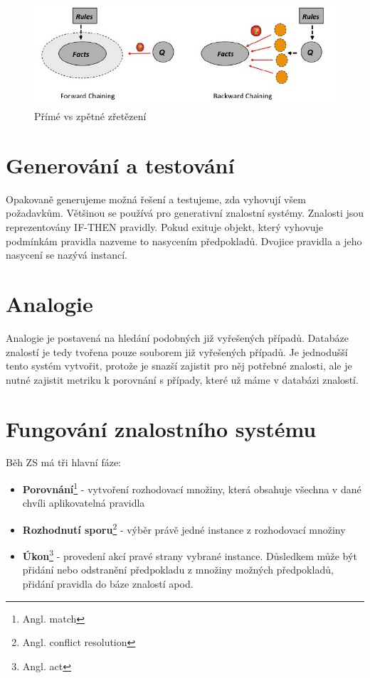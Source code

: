 \documentclass{article}
\begin{document}
\begin{figure}[h]
\begin{center}
\includegraphics[scale=0.5]{FBC.png}
\caption{Přímé vs zpětné zřetězení}
\end{center}
\end{figure}

\section*{Generování a testování}

Opakovaně generujeme možná řešení a testujeme, zda vyhovují všem požadavkům. Většinou se používá pro generativní znalostní systémy. Znalosti jsou reprezentovány IF-THEN pravidly. Pokud exituje objekt, který vyhovuje podmínkám pravidla nazveme to nasycením předpokladů. Dvojice pravidla a jeho nasycení se nazývá instancí.

\section*{Analogie}

Analogie je postavená na hledání podobných již vyřešených případů. Databáze znalostí je tedy tvořena pouze souborem již vyřešených případů. Je jednodušší tento systém vytvořit, protože je snazší zajistit pro něj potřebné znalosti, ale je nutné zajistit metriku k porovnání s případy, které už máme v databázi znalostí.

\section*{Fungování znalostního systému}

Běh ZS má tři hlavní fáze:

\begin{itemize}
\item \textbf{Porovnání}\footnote{Angl. match} - vytvoření rozhodovací množiny, která obsahuje všechna v dané chvíli aplikovatelná pravidla

\item \textbf{Rozhodnutí sporu}\footnote{Angl. conflict resolution} - výběr právě jedné instance z rozhodovací množiny

\item \textbf{Úkon}\footnote{Angl. act} - provedení akcí pravé strany vybrané instance. Důsledkem může být přidání nebo odstranění předpokladu z množiny možných předpokladů, přidání pravidla do báze znalostí apod.
\end{itemize}
\end{document}
